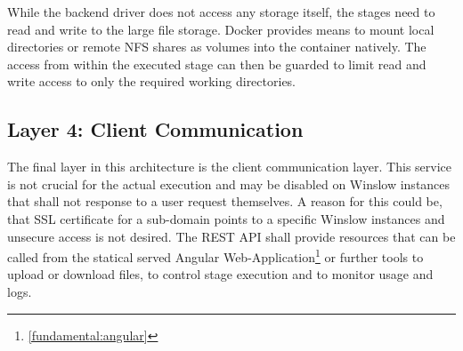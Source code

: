 While the backend driver does not access any storage itself, the stages need to read and write to the large file storage.
Docker provides means to mount local directories or remote NFS shares as volumes into the container natively.
The access from within the executed stage can then be guarded to limit read and write access to only the required working directories.

\subsection{Layer 4: Client Communication}

The final layer in this architecture is the client communication layer.
This service is not crucial for the actual execution and may be disabled on Winslow instances that shall not response to a user request themselves.
A reason for this could be, that SSL certificate for a sub-domain points to a specific Winslow instances and unsecure access is not desired.
The REST API shall provide resources that can be called from the statical served Angular Web-Application\footnote{ \autoref{fundamental:angular}} or further tools to upload or download files, to control stage execution and to monitor usage and logs.
